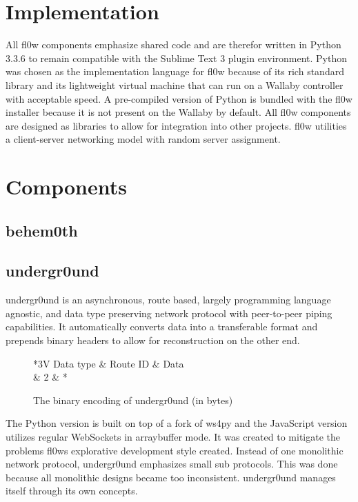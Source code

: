 \documentclass[conference]{IEEEtran}
\begin{document}
\section{Implementation}
All fl0w components emphasize shared code and are therefor written in Python 3.3.6\cite{Python 3.3.6:Python Foundation} to remain compatible with the Sublime Text 3\cite{Sublime Text 3:Sublime HQ} plugin environment. Python was chosen as the implementation language for fl0w because of its rich standard library and its lightweight virtual machine that can run on a Wallaby controller with acceptable speed. A pre-compiled version of Python \cite{Python 3.3.6:Python Foundation} is bundled with the fl0w installer because it is not present on the Wallaby by default. All fl0w components are designed as libraries to allow for integration into other projects. fl0w utilities a client-server networking model with random server assignment.

\section{Components}
\subsection{behem0th}

\subsection{undergr0und}
undergr0und\cite{undergr0und:Philip Trauner} is an asynchronous, route based, largely programming language agnostic, and data type preserving network protocol with peer-to-peer piping capabilities.
It automatically converts data into a transferable format and prepends binary headers to allow for reconstruction on the other end.

\begin{figure}[H]
\centering
	\begin{tabular}{*{3}{V}}
		Data type & Route ID & Data \\  & 2 & * \\
	\end{tabular}
	\caption{The binary encoding of undergr0und (in bytes)}
\label{fig:undergr0und_header}
\end{figure}


The Python\cite{Python 3.3.6:Python Foundation} version is built on top of a fork of ws4py\cite{ws4py:Philip Trauner} and the JavaScript version utilizes regular WebSockets\cite{The WebSocket Protocol:A. Melnikov} in arraybuffer mode. It was created to mitigate the problems fl0ws explorative development style created. Instead of one monolithic network protocol, undergr0und emphasizes small sub protocols. This was done because all monolithic designs became too inconsistent. undergr0und\cite{undergr0und:Philip Trauner} manages itself through its own concepts.
\end{document}
